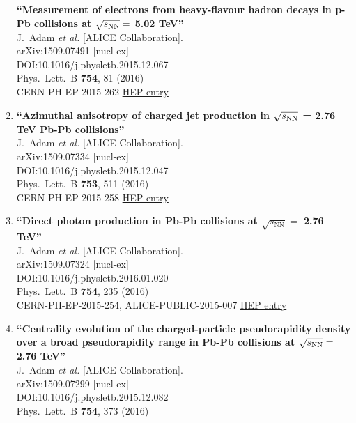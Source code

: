 \begin{enumerate}
{\bf ``Measurement of electrons from heavy-flavour hadron decays in p-Pb collisions at $\sqrt{s_{\rm NN}} =$ 5.02 TeV''}
  \\{}J.~Adam {\it et al.} [ALICE Collaboration].
  \\{}arXiv:1509.07491 [nucl-ex]
  \\{}DOI:10.1016/j.physletb.2015.12.067
  \\{}Phys.\ Lett.\ B {\bf 754}, 81 (2016)
  \\{}CERN-PH-EP-2015-262
\href{http://inspirehep.net/record/1394682}{HEP entry}
\item%
{\bf ``Azimuthal anisotropy of charged jet production in $\sqrt{s_{\rm NN}}$ = 2.76 TeV Pb-Pb collisions''}
  \\{}J.~Adam {\it et al.} [ALICE Collaboration].
  \\{}arXiv:1509.07334 [nucl-ex]
  \\{}DOI:10.1016/j.physletb.2015.12.047
  \\{}Phys.\ Lett.\ B {\bf 753}, 511 (2016)
  \\{}CERN-PH-EP-2015-258
\href{http://inspirehep.net/record/1394678}{HEP entry}
\item%
{\bf ``Direct photon production in Pb-Pb collisions at $\sqrt{s_\mathrm{NN}} =$ 2.76 TeV''}
  \\{}J.~Adam {\it et al.} [ALICE Collaboration].
  \\{}arXiv:1509.07324 [nucl-ex]
  \\{}DOI:10.1016/j.physletb.2016.01.020
  \\{}Phys.\ Lett.\ B {\bf 754}, 235 (2016)
  \\{}CERN-PH-EP-2015-254, ALICE-PUBLIC-2015-007
\href{http://inspirehep.net/record/1394677}{HEP entry}
\item%
{\bf ``Centrality evolution of the charged-particle pseudorapidity density over a broad pseudorapidity range in Pb-Pb collisions at $\sqrt{s_{\rm NN}} =$ 2.76 TeV''}
  \\{}J.~Adam {\it et al.} [ALICE Collaboration].
  \\{}arXiv:1509.07299 [nucl-ex]
  \\{}DOI:10.1016/j.physletb.2015.12.082
  \\{}Phys.\ Lett.\ B {\bf 754}, 373 (2016)

\end{enumerate}

